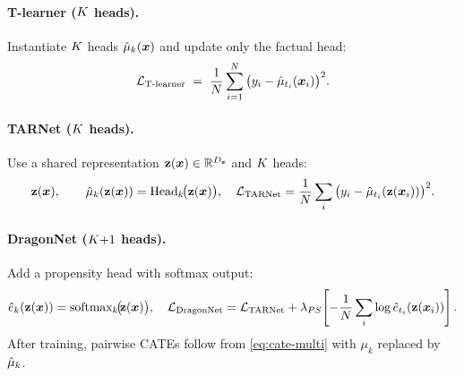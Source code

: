 \paragraph{T-learner ($K$ heads).}
Instantiate $K$ heads $\hat{\mu}_k({\bm{x}})$ and update only the factual head:
\begin{equation}
\label{eq:T-multi}
\mathcal{L}_{\text{T-learner}}\;=\;\frac{1}{N}\sum_{i=1}^{N}\big(y_i-\hat{\mu}_{t_i}({\bm{x}}_i)\big)^2.
\end{equation}

\paragraph{TARNet ($K$ heads).}
Use a shared representation ${\mathbf{z}}({\bm{x}})\in\mathbb{R}^{{{D}_{\mathbf{z}}}}$ and $K$ heads:
\begin{equation}
\label{eq:TAR-multi}
{\mathbf{z}}({\bm{x}}),\qquad \hat{\mu}_k({\mathbf{z}}({\bm{x}}))=\text{Head}_k\!\big({\mathbf{z}}({\bm{x}})\big),\quad
\mathcal{L}_{\text{TARNet}}=\frac{1}{N}\sum_{i} \big(y_i-\hat{\mu}_{t_i}({\mathbf{z}}({\bm{x}}_i))\big)^2.
\end{equation}

\paragraph{DragonNet ($K{+}1$ heads).}
Add a propensity head with softmax output:
\begin{equation}
\label{eq:Drag-multi}
\hat{e}_k({\mathbf{z}}({\bm{x}}))=\text{softmax}_k\!\big(\!{\mathbf{z}}({\bm{x}})\big),\quad
\mathcal{L}_{\text{DragonNet}}=\mathcal{L}_{\text{TARNet}}+
\lambda_{PS}
\!\left[-\frac{1}{N}\sum_{i}\log \hat{e}_{t_i}({\mathbf{z}}({\bm{x}}_i))\right].
\end{equation}
After training, pairwise CATEs follow from \eqref{eq:cate-multi} with $\mu_k$ replaced by $\hat{\mu}_k$.

